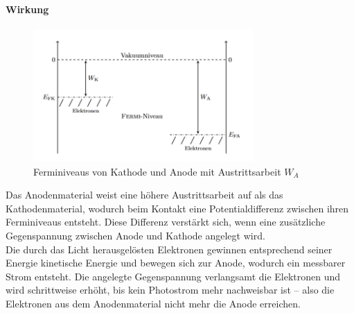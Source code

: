 \paragraph{Wirkung}
\begin{figure}[htbp]
    \centering
    \includegraphics[width=0.75\textwidth]{figs/baenderschema_kathode_anode.png}
    \caption{ Ferminiveaus von Kathode und Anode mit Austrittsarbeit $W_A$ \cite{praktikum}}
    \label{fig:kathode-anode}
\end{figure}
\FloatBarrier
Das Anodenmaterial weist eine höhere Austrittsarbeit auf als das Kathodenmaterial, wodurch beim Kontakt eine Potentialdifferenz zwischen ihren Ferminiveaus entsteht. Diese Differenz verstärkt sich, wenn eine zusätzliche Gegenspannung zwischen Anode und Kathode angelegt wird.\\
Die durch das Licht herausgelösten Elektronen gewinnen entsprechend seiner Energie kinetische Energie und bewegen sich zur Anode, wodurch ein messbarer Strom entsteht. Die angelegte Gegenspannung verlangsamt die Elektronen und wird schrittweise erhöht, bis kein Photostrom mehr nachweisbar ist – also die Elektronen aus dem Anodenmaterial nicht mehr die Anode erreichen.

